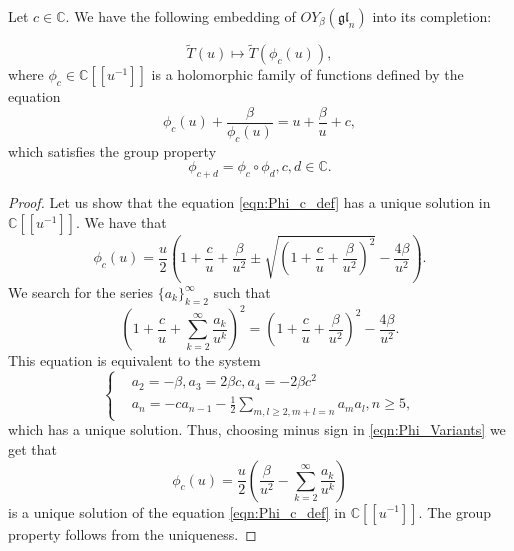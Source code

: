 \documentclass[10pt,a4paper]{amsart}
\newcommand{\gl}{{\mathfrak{gl}}}
\begin{document}
\begin{prop}
Let  $c\in\mathbb{C}$. We have the following embedding of $OY_{\beta}(\gl_n)$ into its completion:

\begin{equation}
\tilde{T}(u)\mapsto \tilde{T}(\phi_c(u)),
\end{equation}
where $\phi_c\in \mathbb{C}[[u^{-1}]]$ is a holomorphic family of functions defined by the equation
\begin{equation}\label{eqn:Phi_c_def}
\phi_c(u)+\frac{\beta}{\phi_c(u)}=u+\frac{\beta}{u}+c, 
\end{equation}
which satisfies the group property
\[
\phi_{c+d}=\phi_c\circ\phi_d, c,d\in \mathbb{C}.
\]
\end{prop}

\begin{proof}

Let us show that the equation \eqref{eqn:Phi_c_def} has a unique solution in $\mathbb{C}[[u^{-1}]]$. We have that 
\begin{equation}
\phi_c(u)=\frac{u}{2}\left(1+\frac{c}{u}+\frac{\beta}{u^2}\pm\sqrt{(1+\frac{c}{u}+\frac{\beta}{u^2})^2}-\frac{4\beta}{u^2}\right).\label{eqn:Phi_Variants}
\end{equation}
We search for the series $\{a_k\}_{k=2}^{\infty}$ such that
\[
\left(1+\frac{c}{u}+\sum\limits_{k=2}^{\infty}\frac{a_k}{u^k}\right)^2=\left(1+\frac{c}{u}+\frac{\beta}{u^2}\right)^2-\frac{4\beta}{u^2}.
\]
This equation is equivalent to the system
\begin{equation}
    \left\{
\begin{array}{cc}
     &a_2 = -\beta ,a_3 =2\beta c, a_4 = -2\beta c^2\\
     &a_n = -c a_{n-1}-\frac{1}{2}\sum\limits_{m,l\geq 2, m+l=n} a_m a_l,n\geq 5,
\end{array}
    \right.
\end{equation}
which has a unique solution. Thus, choosing minus sign in \eqref{eqn:Phi_Variants} we get that
\begin{equation}
   \phi_c(u)= \frac{u}{2}\left(\frac{\beta}{u^2}-\sum\limits_{k=2}^{\infty}\frac{a_k}{u^k}\right)
\end{equation}
is a unique solution of the equation \eqref{eqn:Phi_c_def} in $\mathbb{C}[[u^{-1}]]$. The group property follows from 
 the uniqueness.


    
\end{proof}
\end{document}
